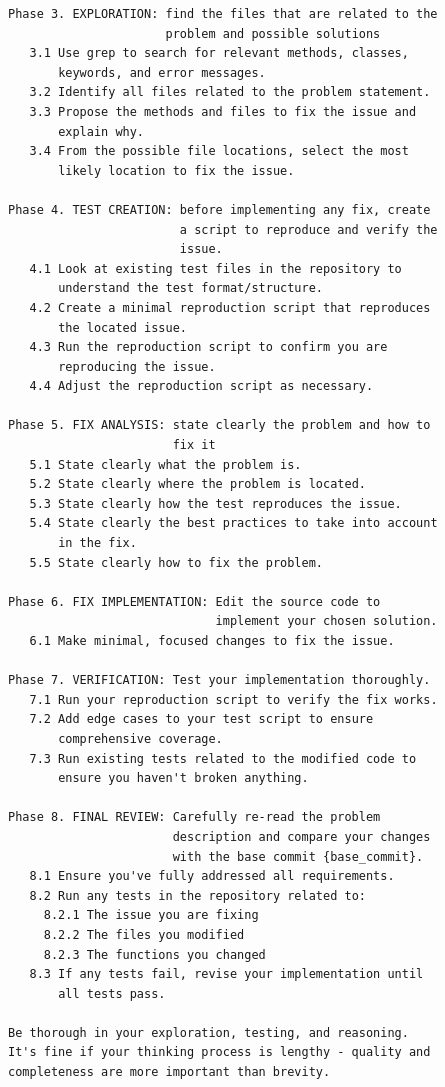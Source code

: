 \documentclass{llmxive}
\begin{document}
\begin{verbatim}
Phase 3. EXPLORATION: find the files that are related to the
                      problem and possible solutions
   3.1 Use grep to search for relevant methods, classes,
       keywords, and error messages.
   3.2 Identify all files related to the problem statement.
   3.3 Propose the methods and files to fix the issue and
       explain why.
   3.4 From the possible file locations, select the most
       likely location to fix the issue.

Phase 4. TEST CREATION: before implementing any fix, create
                        a script to reproduce and verify the
                        issue.
   4.1 Look at existing test files in the repository to
       understand the test format/structure.
   4.2 Create a minimal reproduction script that reproduces
       the located issue.
   4.3 Run the reproduction script to confirm you are
       reproducing the issue.
   4.4 Adjust the reproduction script as necessary.

Phase 5. FIX ANALYSIS: state clearly the problem and how to
                       fix it
   5.1 State clearly what the problem is.
   5.2 State clearly where the problem is located.
   5.3 State clearly how the test reproduces the issue.
   5.4 State clearly the best practices to take into account
       in the fix.
   5.5 State clearly how to fix the problem.

Phase 6. FIX IMPLEMENTATION: Edit the source code to
                             implement your chosen solution.
   6.1 Make minimal, focused changes to fix the issue.

Phase 7. VERIFICATION: Test your implementation thoroughly.
   7.1 Run your reproduction script to verify the fix works.
   7.2 Add edge cases to your test script to ensure
       comprehensive coverage.
   7.3 Run existing tests related to the modified code to
       ensure you haven't broken anything.

Phase 8. FINAL REVIEW: Carefully re-read the problem
                       description and compare your changes
                       with the base commit {base_commit}.
   8.1 Ensure you've fully addressed all requirements.
   8.2 Run any tests in the repository related to:
     8.2.1 The issue you are fixing
     8.2.2 The files you modified
     8.2.3 The functions you changed
   8.3 If any tests fail, revise your implementation until
       all tests pass.

Be thorough in your exploration, testing, and reasoning.
It's fine if your thinking process is lengthy - quality and
completeness are more important than brevity.
\end{verbatim}
\end{document}
